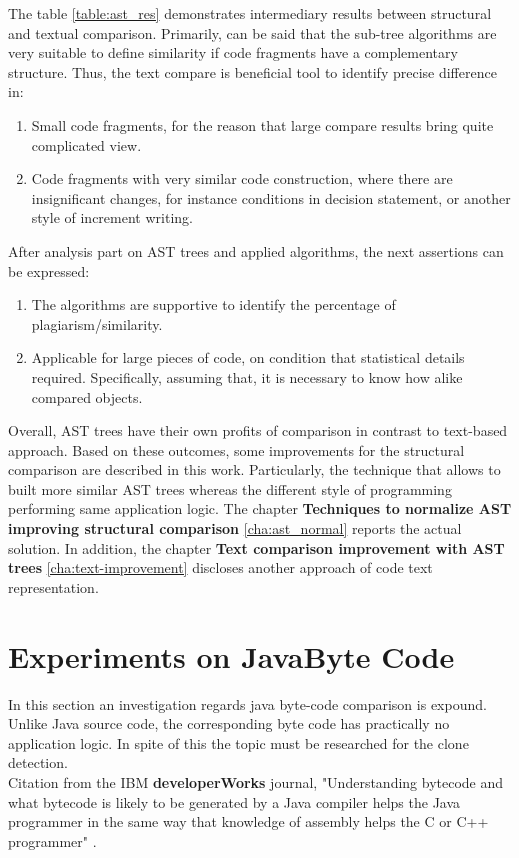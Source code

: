 \documentclass{report}
\begin{document}
The table \ref{table:ast_res} demonstrates intermediary results between structural and textual comparison. Primarily, can be said that the sub-tree algorithms are very suitable to define similarity if code fragments have a complementary structure. Thus, the text compare is beneficial tool to identify precise difference in:
\begin{enumerate}
	\item Small code fragments, for the reason that large compare results bring quite complicated view.
	\item Code fragments with very similar code construction, where there are insignificant changes, for instance conditions in decision statement, or another style of increment writing.
\end{enumerate}
After analysis part on AST trees and applied algorithms, the next assertions can be expressed:
\begin{enumerate}
	\item The algorithms are supportive to identify the percentage of plagiarism/similarity.
	\item Applicable for large pieces of code, on condition that statistical details required. Specifically, assuming that, it is necessary to know how alike compared objects.
\end{enumerate}
Overall, AST trees have their own profits of comparison in contrast to text-based approach. 
Based on these outcomes, some improvements for the structural comparison are described in this work. Particularly, the technique that allows to built more similar AST trees whereas the different style of programming performing same application logic. The chapter \textbf{Techniques to normalize AST improving structural comparison} \ref{cha:ast_normal} reports the actual solution. In addition, the chapter \textbf{Text comparison improvement with AST trees} \ref{cha:text-improvement} discloses another approach of code text representation.

\section{Experiments on JavaByte Code}
\label{sec: java-code-experiments}

In this section an investigation regards java byte-code comparison is expound. Unlike Java source code, the corresponding byte code has practically no application logic. In spite of this the topic must be researched for the clone detection. \\
Citation from the IBM \textbf{developerWorks} journal, "Understanding bytecode and what bytecode is likely to be generated by a Java compiler helps the Java programmer in the same way that knowledge of assembly helps the C or C++ programmer" \cite{ibm}. 
\end{document}
